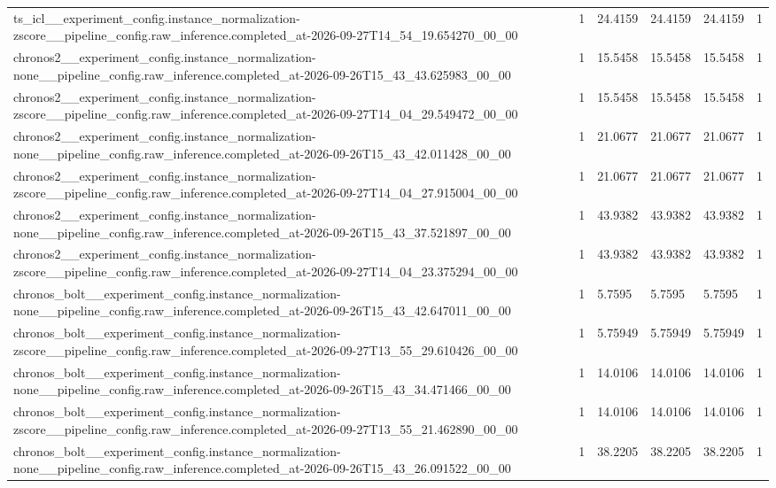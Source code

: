 \begin{tabular}{llllll}
ts\_icl\_\_experiment\_config.instance\_normalization-zscore\_\_pipeline\_config.raw\_inference.completed\_at-2026-09-27T14\_54\_19.654270\_00\_00 & 1 & 24.4159 & 24.4159 & 24.4159 & 1 \\
chronos2\_\_experiment\_config.instance\_normalization-none\_\_pipeline\_config.raw\_inference.completed\_at-2026-09-26T15\_43\_43.625983\_00\_00 & 1 & 15.5458 & 15.5458 & 15.5458 & 1 \\
chronos2\_\_experiment\_config.instance\_normalization-zscore\_\_pipeline\_config.raw\_inference.completed\_at-2026-09-27T14\_04\_29.549472\_00\_00 & 1 & 15.5458 & 15.5458 & 15.5458 & 1 \\
chronos2\_\_experiment\_config.instance\_normalization-none\_\_pipeline\_config.raw\_inference.completed\_at-2026-09-26T15\_43\_42.011428\_00\_00 & 1 & 21.0677 & 21.0677 & 21.0677 & 1 \\
chronos2\_\_experiment\_config.instance\_normalization-zscore\_\_pipeline\_config.raw\_inference.completed\_at-2026-09-27T14\_04\_27.915004\_00\_00 & 1 & 21.0677 & 21.0677 & 21.0677 & 1 \\
chronos2\_\_experiment\_config.instance\_normalization-none\_\_pipeline\_config.raw\_inference.completed\_at-2026-09-26T15\_43\_37.521897\_00\_00 & 1 & 43.9382 & 43.9382 & 43.9382 & 1 \\
chronos2\_\_experiment\_config.instance\_normalization-zscore\_\_pipeline\_config.raw\_inference.completed\_at-2026-09-27T14\_04\_23.375294\_00\_00 & 1 & 43.9382 & 43.9382 & 43.9382 & 1 \\
chronos\_bolt\_\_experiment\_config.instance\_normalization-none\_\_pipeline\_config.raw\_inference.completed\_at-2026-09-26T15\_43\_42.647011\_00\_00 & 1 & 5.7595 & 5.7595 & 5.7595 & 1 \\
chronos\_bolt\_\_experiment\_config.instance\_normalization-zscore\_\_pipeline\_config.raw\_inference.completed\_at-2026-09-27T13\_55\_29.610426\_00\_00 & 1 & 5.75949 & 5.75949 & 5.75949 & 1 \\
chronos\_bolt\_\_experiment\_config.instance\_normalization-none\_\_pipeline\_config.raw\_inference.completed\_at-2026-09-26T15\_43\_34.471466\_00\_00 & 1 & 14.0106 & 14.0106 & 14.0106 & 1 \\
chronos\_bolt\_\_experiment\_config.instance\_normalization-zscore\_\_pipeline\_config.raw\_inference.completed\_at-2026-09-27T13\_55\_21.462890\_00\_00 & 1 & 14.0106 & 14.0106 & 14.0106 & 1 \\
chronos\_bolt\_\_experiment\_config.instance\_normalization-none\_\_pipeline\_config.raw\_inference.completed\_at-2026-09-26T15\_43\_26.091522\_00\_00 & 1 & 38.2205 & 38.2205 & 38.2205 & 1 \\

\end{tabular}

